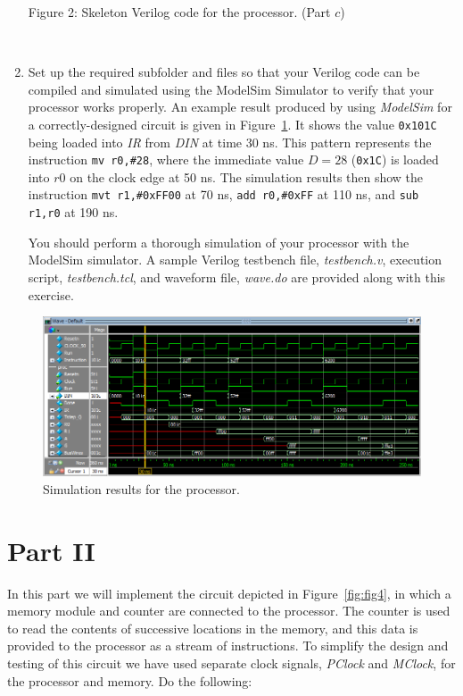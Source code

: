 \documentclass[epsfig,10pt,fullpage]{article}
\begin{document}
\begin{enumerate}
\begin{center}
Figure 2: Skeleton Verilog code for the processor. (Part $c$)
\end{center}

~\\
\item Set up the required subfolder and files so that your Verilog code can be compiled and 
simulated using the ModelSim Simulator to verify that your processor works properly. 
An example result produced by using {\it ModelSim} for a correctly-designed circuit 
is given in Figure~\ref{fig:fig3}.  It shows the value \texttt{0x101C} being loaded into {\it IR} 
from {\it DIN} at time 30 ns. This pattern represents the instruction \texttt{mv r0,\#28}, 
where the immediate value $D = 28$ (\texttt{0x1C}) is loaded into $r0$ on the clock edge at 50 ns. 
The simulation results then show the instruction \texttt{mvt~r1,\#0xFF00} at 70 ns, 
\texttt{add r0,\#0xFF} at 110 ns, and \texttt{sub r1,r0} at 190 ns.

You should perform a thorough simulation of your processor with the ModelSim simulator. A 
sample Verilog testbench file, {\it testbench.v}, execution script, {\it testbench.tcl}, 
and waveform file, {\it wave.do} are provided along with this exercise.
\end{enumerate}
\begin{figure}[H]
	\begin{center}
		\includegraphics[scale=1.0]{figures/figure3.png}
	\end{center}
	\caption{Simulation results for the processor.}
	\label{fig:fig3}
\end{figure}
\section*{Part II}
In this part we will implement the circuit depicted in Figure~\ref{fig:fig4}, in which a 
memory module and counter are connected to the processor. The
counter is used to read the contents of successive locations in the memory, and
this data is provided to the processor as a stream of instructions. To simplify the
design and testing of this circuit we have used separate clock signals, {\it PClock} 
and {\it MClock}, for the processor and memory. Do the following:
\end{document}
